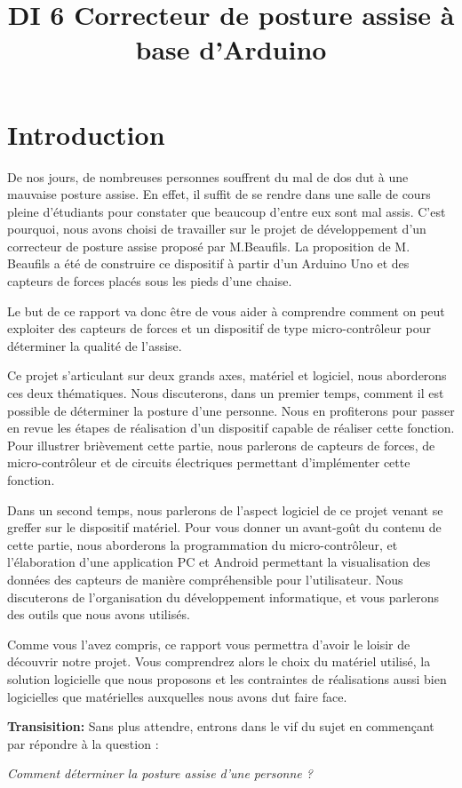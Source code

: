\documentclass{polytech/polytech}
\title{DI 6 Correcteur de posture assise à base d'Arduino}
\begin{document}
\chapter*{Introduction}

De nos jours, de nombreuses personnes souffrent du mal de dos dut à une mauvaise posture assise. En effet, il suffit de se rendre dans une salle de cours pleine d'étudiants pour constater que beaucoup d'entre eux sont mal assis. C'est pourquoi, nous avons choisi de travailler sur le projet de développement d'un correcteur de posture assise proposé par M.Beaufils. La proposition de M. Beaufils a été de construire ce dispositif à partir d'un Arduino Uno et des capteurs de forces placés sous les pieds d'une chaise. 

Le but de ce rapport va donc être de vous aider à comprendre comment on peut exploiter des capteurs de forces et un dispositif de type micro-contrôleur pour déterminer la qualité de l'assise. 

Ce projet s'articulant sur deux grands axes, matériel et logiciel, nous aborderons ces deux thématiques.
Nous discuterons, dans un premier temps, comment il est possible de déterminer la posture d'une personne. Nous en profiterons pour passer en revue les étapes de réalisation d'un dispositif capable de réaliser cette fonction. Pour illustrer brièvement cette partie, nous parlerons de capteurs de forces, de micro-contrôleur et de circuits électriques permettant d'implémenter cette fonction.

Dans un second temps, nous parlerons de l'aspect logiciel de ce projet venant se greffer sur le dispositif matériel. Pour vous donner un avant-goût du contenu de cette partie, nous aborderons la programmation du micro-contrôleur, et l'élaboration d'une application PC et Android permettant la visualisation des données des capteurs de manière compréhensible pour l'utilisateur.
Nous discuterons de l'organisation du développement informatique, et vous parlerons des outils que nous avons utilisés.


Comme vous l'avez compris, ce rapport vous permettra d'avoir le loisir de découvrir notre projet. Vous comprendrez alors le choix du matériel utilisé, la solution logicielle que nous proposons et les contraintes de réalisations aussi bien logicielles que matérielles auxquelles nous avons dut faire face.


\textbf{Transisition:} Sans plus attendre, entrons dans le vif du sujet en commençant par répondre à la question :

\begin{center}
\textit{Comment déterminer la posture assise d'une personne ? }
\end{center}
\end{document}
